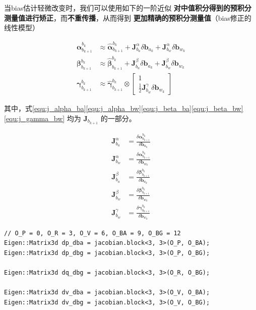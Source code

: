 \documentclass[12pt,a4paper]{article}
\begin{document}
当bias估计轻微改变时，我们可以使用如下的一阶近似 \textbf{对中值积分得到的预积分测量值进行矫正}，而\textbf{不重传播}，从而得到 \textbf{更加精确的预积分测量值}（bias修正的线性模型）

\begin{equation}
\begin{aligned} 
\boldsymbol{\alpha}_{b_{k+1}}^{b_{k}} & \approx 
\hat{\boldsymbol{\alpha}}_{b_{k+1}}^{b_{k}}+
\mathbf{J}_{b_{a}}^{\alpha} \delta \mathbf{b}_{a_{k}}+
\mathbf{J}_{b_{w}}^{\alpha} \delta \mathbf{b}_{w_{k}} \\ 
\boldsymbol{\beta}_{b_{k+1}}^{b_{k}} & \approx 
\hat{\boldsymbol{\beta}}_{b_{k+1}}^{b_{k}}+
\mathbf{J}_{b_{a}}^{\beta} \delta \mathbf{b}_{a_{k}}+
\mathbf{J}_{b_{w}}^{\beta} \delta \mathbf{b}_{w_{k}} \\ 
\boldsymbol{\gamma}_{b_{k+1}}^{b_{k}} & \approx 
\hat{\boldsymbol{\gamma}}_{b_{k+1}}^{b_{k}} \otimes
\left[\begin{array}{c}{1} \\ 
{\frac{1}{2} \mathbf{J}_{b_{w}}^{\gamma} \delta \mathbf{b}_{w_{k}}}\end{array}\right] 
\end{aligned}
\end{equation}

其中，式\eqref{equ:j_alpha_ba}\eqref{equ:j_alpha_bw}\eqref{equ:j_beta_ba}\eqref{equ:j_beta_bw}\eqref{equ:j_gamma_bw} 均为 $\mathbf{J}_{b_{k+1}}$ 的一部分。

\begin{align}
\label{equ:j_alpha_ba}
\mathbf{J}_{b_{a}}^{\alpha}&=
\frac{\delta \boldsymbol{\alpha}_{b_{k+1}}^{b_{k}}}{\delta \mathbf{b}_{a_{k}}} \\
\label{equ:j_alpha_bw}
\mathbf{J}_{b_{w}}^{\alpha}&= 
\frac{\delta \boldsymbol{\alpha}_{b_{k+1}}^{b_{k}}}{\delta \mathbf{b}_{w_{k}}} \\
\label{equ:j_beta_ba}
\mathbf{J}_{b_{a}}^{\beta}&=
\frac{\delta \boldsymbol{\beta}_{b_{k+1}}^{b_{k}}}{\delta \mathbf{b}_{a_{k}}} \\
\label{equ:j_beta_bw}
\mathbf{J}_{b_{w}}^{\beta}&=
\frac{\delta \boldsymbol{\beta}_{b_{k+1}}^{b_{k}}}{\delta \mathbf{b}_{w_{k}}} \\
\label{equ:j_gamma_bw}
\mathbf{J}_{b_{w}}^{\gamma}&=
\frac{\delta \boldsymbol{\gamma}_{b_{k+1}}^{b_{k}}}{\delta \mathbf{b}_{w_{k}}}
\end{align}

\begin{lstlisting}
// O_P = 0, O_R = 3, O_V = 6, O_BA = 9, O_BG = 12
Eigen::Matrix3d dp_dba = jacobian.block<3, 3>(O_P, O_BA);
Eigen::Matrix3d dp_dbg = jacobian.block<3, 3>(O_P, O_BG);

Eigen::Matrix3d dq_dbg = jacobian.block<3, 3>(O_R, O_BG);

Eigen::Matrix3d dv_dba = jacobian.block<3, 3>(O_V, O_BA);
Eigen::Matrix3d dv_dbg = jacobian.block<3, 3>(O_V, O_BG);
\end{lstlisting}
\end{document}
